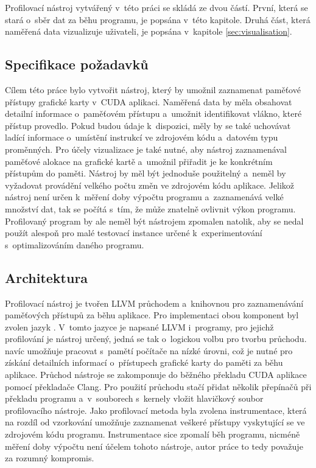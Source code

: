 Profilovací nástroj vytvářený v~této práci se skládá ze dvou částí. První, která se stará o~sběr dat za běhu programu, je popsána v~této kapitole. Druhá část, která naměřená data vizualizuje uživateli, je popsána v~kapitole \ref{sec:visualisation}.

\subsection{Specifikace požadavků}
Cílem této práce bylo vytvořit nástroj, který by umožnil zaznamenat paměťové přístupy grafické karty v~CUDA aplikaci. Naměřená data by měla obsahovat detailní informace o~paměťovém přístupu a~umožnit identifikovat vlákno, které přístup provedlo. Pokud budou údaje k~dispozici, měly by se také uchovávat ladící informace o~umístění instrukcí ve zdrojovém kódu a~datovém typu proměnných.
Pro účely vizualizace je také nutné, aby nástroj zaznamenával paměťové alokace na grafické kartě a~umožnil přiřadit je ke konkrétním přístupům do paměti.
Nástroj by měl být jednoduše použitelný a~neměl by vyžadovat provádění velkého počtu změn ve zdrojovém kódu aplikace. Jelikož nástroj není určen k~měření doby výpočtu programu a~zaznamenává velké množství dat, tak se počítá s~tím, že může znatelně ovlivnit výkon programu. Profilovaný program by ale neměl být nástrojem zpomalen natolik, aby se nedal použít alespoň pro malé testovací instance určené k~experimentování s~optimalizováním daného programu.

\subsection{Architektura}
Profilovací nástroj je tvořen LLVM průchodem a~knihovnou pro zaznamenávání paměťových přístupů za běhu aplikace. Pro implementaci obou komponent byl zvolen jazyk \emph{\CPP}. V~tomto jazyce je napsané LLVM i~programy, pro jejichž profilování je nástroj určený, jedná se tak o~logickou volbu pro tvorbu průchodu. \CPP\hspace{1mm}navíc umožňuje pracovat s~pamětí počítače na nízké úrovni, což je nutné pro získání detailních informací o~přístupech grafické karty do paměti za běhu aplikace.
Průchod nástroje se zakomponuje do běžného překladu CUDA aplikace pomocí překladače Clang. Pro použití průchodu stačí přidat několik přepínačů při překladu programu a~v~souborech s~kernely vložit hlavičkový soubor profilovacího nástroje. 
Jako profilovací metoda byla zvolena instrumentace, která na rozdíl od vzorkování umožňuje zaznamenat veškeré přístupy vyskytující se ve zdrojovém kódu programu. Instrumentace sice zpomalí běh programu, nicméně měření doby výpočtu není účelem tohoto nástroje, autor práce to tedy považuje za rozumný kompromis.


